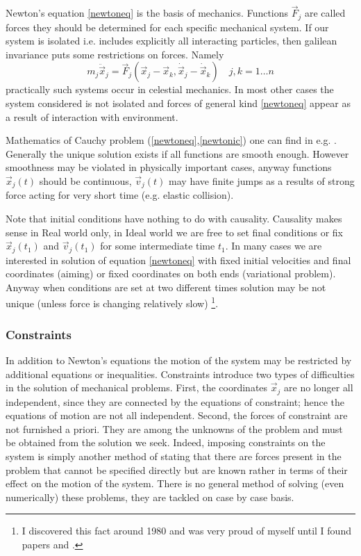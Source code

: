 Newton's equation \eqref{newtoneq} is  the basis of mechanics. Functions $\vec F_j$
are called forces they should be determined  for each specific mechanical system. If our system
is isolated i.e. includes explicitly all interacting particles, then galilean invariance puts some restrictions on forces.
Namely 
\begin{equation}
  \label {newtoneq-isolated}
    m_j \ddot \vec x_j=\vec F_j(\vec x_j-\vec x_k,\dot \vec x_j-\dot \vec x_k) \quad j,k=1\ldots n 
\end{equation}
practically such systems occur in celestial mechanics. In most other cases the system 
considered is not isolated and forces of general kind \eqref{newtoneq} appear as a result 
of interaction with environment.

Mathematics of  Cauchy problem (\ref{newtoneq},\ref{newtonic}) 
one can find in e.g. \cite{Arnold-ode}. Generally the unique solution exists if
all functions are smooth enough. However smoothness may be violated in physically
important cases, anyway functions $\vec x_j(t)$ should be continuous, $\vec v_j(t)$  may
have finite jumps as a results of strong force acting for very short time (e.g. 
elastic collision).

Note that initial conditions have nothing to do with causality. Causality makes
sense in Real world only, in Ideal world we are free to set final conditions or
fix $\vec x_j(t_1)$ and $\vec v_j(t_1)$ for some intermediate time $t_1$. In
many cases we are interested in solution of equation \eqref{newtoneq} with
fixed initial velocities and final coordinates  (aiming) or fixed coordinates
on both ends (variational problem). Anyway when conditions are set at two
different times  solution may be not unique (unless force is changing
relatively slow) \footnote {I discovered this fact around 1980 and was very
proud of myself until I found papers \cite{Maslov-1} and \cite{Maslov-2}.}.

\subsubsection{Constraints} 

In addition to Newton's equations the motion of the system may be restricted by
additional equations or inequalities. Constraints introduce two types of
difficulties in the solution of mechanical problems. First, the coordinates
$\vec x_j$ are no longer all independent, since they are connected by the
equations of constraint; hence the equations of motion  are not all
independent. Second, the forces of constraint  are not furnished a priori. They
are among the unknowns of the problem and must be obtained from the solution we
seek. Indeed, imposing constraints on the system  is simply another method of
stating that there are forces present in the problem that cannot be specified
directly but are known rather in terms of their effect on the motion of the
system. There is no general method of solving (even numerically) these
problems, they are tackled on case by case basis.

